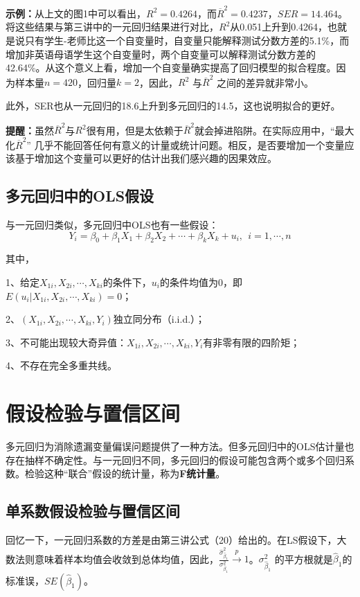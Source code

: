 \documentclass[cn,12pt,math=newtx,citestyle=gb7714-2015,bibstyle=gb7714-2015]{elegantbook}
\begin{document}
	\textbf{示例：}从上文的图1中可以看出，$R^2=0.4264$，而$\overline{R}^2=0.4237$，$SER=14.464$。将这些结果与第三讲中的一元回归结果进行对比，$R^2$从0.051上升到0.4264，也就是说只有学生-老师比这一个自变量时，自变量只能解释测试分数方差的5.1\%，而增加非英语母语学生这个自变量时，两个自变量可以解释测试分数方差的42.64\%。从这个意义上看，增加一个自变量确实提高了回归模型的拟合程度。因为样本量$n=420$，回归量$k=2$，因此，$R^2$ 与$\overline{R}^2$ 之间的差异就非常小。
	
	此外，SER也从一元回归的18.6上升到多元回归的14.5，这也说明拟合的更好。
	
	\textbf{提醒：}虽然$\overline{R}^2$与$R^2$很有用，但是太依赖于$\overline{R}^2$就会掉进陷阱。在实际应用中，“最大化$\overline{R}^2$” 几乎不能回答任何有意义的计量或统计问题。相反，是否要增加一个变量应该基于增加这个变量可以更好的估计出我们感兴趣的因果效应。
	
	\subsection{多元回归中的OLS假设}
	与一元回归类似，多元回归中OLS也有一些假设：
	\begin{equation}
		Y_i=\beta_0+\beta_1X_1+\beta_2X_2+\cdots+\beta_kX_k+u_i,~~i=1,\cdots,n
	\end{equation}
	
	其中，
	
	1、给定$X_{1i},X_{2i},\cdots,X_{ki}$的条件下，$u_i$的条件均值为0，即$E(u_i|X_{1i},X_{2i},\cdots,X_{ki})=0$；
	
	2、$(X_{1i},X_{2i},\cdots,X_{ki},Y_i)$独立同分布（i.i.d.）；
	
	3、不可能出现较大奇异值：$X_{1i},X_{2i},\cdots,X_{ki},Y_i$有非零有限的四阶矩；
	
	4、不存在完全多重共线。
	
	\section{假设检验与置信区间}
	多元回归为消除遗漏变量偏误问题提供了一种方法。但多元回归中的OLS估计量也存在抽样不确定性。与一元回归不同，多元回归的假设可能包含两个或多个回归系数。检验这种“联合”假设的统计量，称为\textbf{F统计量}。
	
	\subsection{单系数假设检验与置信区间}
	回忆一下，一元回归系数的方差是由第三讲公式（20）给出的。在LS假设下，大数法则意味着样本均值会收敛到总体均值，因此，$\frac{\hat{\sigma}_{\hat{\beta}_1}^2}{\sigma_{\hat{\beta}_1}^2}\xrightarrow{p}1$。$\sigma_{\hat{\beta}_1}^2$ 的平方根就是$\hat{\beta}_1$的标准误，$SE(\hat{\beta}_1)$。
	
\end{document}
